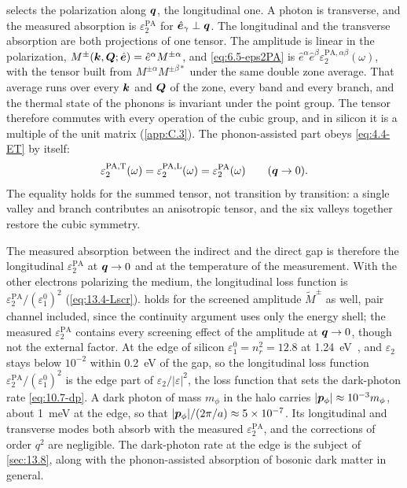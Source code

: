  selects the polarization along $\bm{q}$, the longitudinal one. A photon is transverse, and the measured absorption is $\varepsilon_2^{\mathrm{PA}}$ for $\hat{\bm{e}}_\gamma \perp \bm{q}$. The longitudinal and the transverse absorption are both projections of one tensor. The amplitude is linear in the polarization, $M^\pm(\bm{k},\bm{Q};\hat{\bm{e}}) = \hat{e}^\alpha M^{\pm\alpha}$, and \cref{eq:6.5-eps2PA} is $\hat{e}^\alpha\hat{e}^\beta\varepsilon_2^{\mathrm{PA},\alpha\beta}(\omega)$, with the tensor built from $M^{\pm\alpha}M^{\pm\beta*}$ under the same double zone average. That average runs over every $\bm{k}$ and $\bm{Q}$ of the zone, every band and every branch, and the thermal state of the phonons is invariant under the point group. The tensor therefore commutes with every operation of the cubic group, and in silicon it is a multiple of the unit matrix (\cref{app:C.3}). The phonon-assisted part obeys \cref{eq:4.4-ET} by itself:
\begin{equation*}
  \varepsilon_2^{\mathrm{PA,T}}(\omega) = \varepsilon_2^{\mathrm{PA,L}}(\omega) = \varepsilon_2^{\mathrm{PA}}(\omega) \qquad (\bm{q}\to0) .
\end{equation*}
The equality holds for the summed tensor, not transition by transition: a single valley and branch contributes an anisotropic tensor, and the six valleys together restore the cubic symmetry.

The measured absorption between the indirect and the direct gap is therefore the longitudinal $\varepsilon_2^{\mathrm{PA}}$ at $\bm{q}\to0$ and at the temperature of the measurement. With the other electrons polarizing the medium, the longitudinal loss function is $\varepsilon_2^{\mathrm{PA}}/(\varepsilon_1^0)^2$ (\cref{eq:13.4-Lscr}).  holds for the screened amplitude $\tilde M^\pm$ as well, pair channel included, since the continuity argument uses only the energy shell; the measured $\varepsilon_2^{\mathrm{PA}}$ contains every screening effect of the amplitude at $\bm{q}\to0$, though not the external factor. At the edge of silicon $\varepsilon_1^0 = n_r^2 = 12.8$ at \SI{1.24}{eV}~\cite{franta2017temperature}, and $\varepsilon_2$ stays below $10^{-2}$ within \SI{0.2}{eV} of the gap, so the longitudinal loss function $\varepsilon_2^{\mathrm{PA}}/(\varepsilon_1^0)^2$ is the edge part of $\varepsilon_2/|\varepsilon|^2$, the loss function that sets the dark-photon rate \cref{eq:10.7-dp}. A dark photon of mass $m_\phi$ in the halo carries $|\bm{p}_\phi| \approx 10^{-3}m_\phi$, about \SI{1}{meV} at the edge, so that $|\bm{p}_\phi|/(2\pi/a) \approx 5\times10^{-7}$. Its longitudinal and transverse modes both absorb with the measured $\varepsilon_2^{\mathrm{PA}}$, and the corrections of order $q^2$ are negligible. The dark-photon rate at the edge is the subject of \cref{sec:13.8}, along with the phonon-assisted absorption of bosonic dark matter in general.

